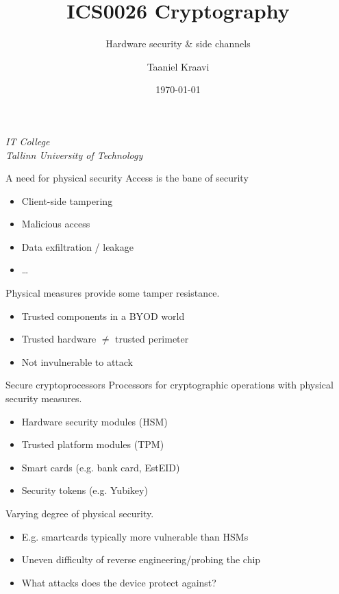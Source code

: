 \title{ICS0026 Cryptography}
\subtitle{Hardware security \& side channels}
\date{\today}
\author{Taaniel Kraavi}
\institute%
{%
  \textit{IT College}\\
  \textit{Tallinn University of Technology}
}


\begin{frame}
  \titlepage
\end{frame}

\begin{frame}{A need for physical security}
  Access is the bane of security
  \begin{itemize}[<+(1)->]
    \item Client-side tampering
    \item Malicious access
    \item Data exfiltration / leakage
    \item \dots
  \end{itemize}

  \vspace*{1em}

  \pause
  Physical measures provide some tamper resistance.
  \begin{itemize}[<+(1)->]
    \item Trusted components in a BYOD world
    \item Trusted hardware $\neq$ trusted perimeter
    \item Not invulnerable to attack
  \end{itemize}
\end{frame}

\begin{frame}{Secure cryptoprocessors}
  Processors for cryptographic operations with physical security measures.
  \begin{itemize}[<+(1)->]
    \item Hardware security modules (HSM)
    \item Trusted platform modules (TPM)
    \item Smart cards (e.g. bank card, EstEID)
    \item Security tokens (e.g. Yubikey)
  \end{itemize}

  \vspace*{1em}

  \pause
  Varying degree of physical security.
  \begin{itemize}[<+(1)->]
    \item E.g. smartcards typically more vulnerable than HSMs
    \item Uneven difficulty of reverse engineering/probing the chip
    \item What attacks does the device protect against?
  \end{itemize}
\end{frame}

